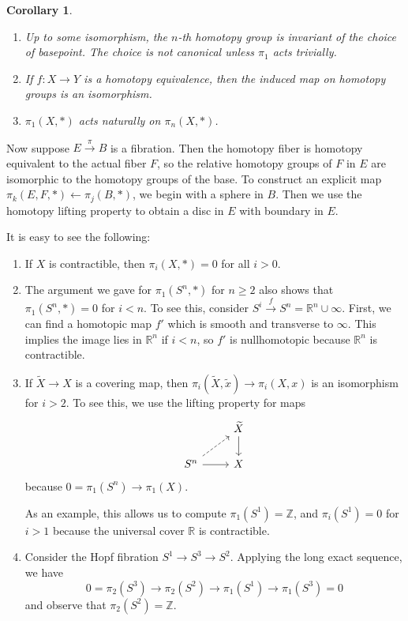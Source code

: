 \documentclass[leqno, openany]{memoir}
\newtheorem{cor}[thm]{Corollary}
\theoremstyle{definition}
\theoremstyle{remark}
\theoremstyle{plain}
\theoremstyle{definition}
\theoremstyle{remark}
\newcommand{\R}{\mathbb{R}}
\newcommand{\Z}{\mathbb{Z}}
\newcommand{\wt}[1]{\widetilde{#1}}
\begin{document}
\begin{cor}
    \begin{enumerate}
        \item Up to some isomorphism, the $n$-th homotopy group is invariant of the choice of basepoint. The choice is not canonical unless $\pi_1$ acts trivially.
        \item If $f \colon X \to Y$ is a homotopy equivalence, then the induced map on homotopy groups is an isomorphism.
        \item $\pi_1(X,*)$ acts naturally on $\pi_n(X,*)$.
    \end{enumerate}
\end{cor}

Now suppose $E \xrightarrow{\pi} B$ is a fibration. Then the homotopy fiber is homotopy equivalent to the actual fiber $F$, so the relative homotopy groups of $F$ in $E$ are isomorphic to the homotopy groups of the base. To construct an explicit map $\pi_k(E,F,*) \gets \pi_j(B,*)$, we begin with a sphere in $B$. Then we use the homotopy lifting property to obtain a disc in $E$ with boundary in $E$.

It is easy to see the following:
\begin{enumerate}
    \item If $X$ is contractible, then $\pi_i(X,*) = 0$ for all $i > 0$.
    \item The argument we gave for $\pi_1(S^n, *)$ for $n \geq 2$ also shows that $\pi_1(S^n, *) = 0$ for $i < n$. To see this, consider $S^i \xrightarrow{f} S^n = \R^n \cup \infty$. First, we can find a homotopic map $f'$ which is smooth and transverse to $\infty$. This implies the image lies in $\R^n$ if $i < n$, so $f'$ is nullhomotopic because $\R^n$ is contractible.
    \item If $\wt{X} \to X$ is a covering map, then $\pi_i(\wt{X}, \wt{x}) \to \pi_i(X,x)$ is an isomorphism for $i > 2$. To see this, we use the lifting property for maps
        \begin{equation*}
        \begin{tikzcd}
            & \wt{X} \arrow{d} \\
            S^n \arrow{r} \arrow[dashrightarrow]{ur} & X
        \end{tikzcd}
        \end{equation*}
        because $0 = \pi_1(S^n) \to \pi_1(X)$. 

        As an example, this allows us to compute $\pi_1(S^1) = \Z$, and $\pi_i(S^1) = 0$ for $i > 1$ because the universal cover $\R$ is contractible.
    \item Consider the Hopf fibration $S^1 \to S^3 \to S^2$. Applying the long exact sequence, we have
        \[ 0 = \pi_2(S^3) \to \pi_2(S^2) \to \pi_1(S^1) \to \pi_1(S^3) = 0 \]
        and observe that $\pi_2(S^2) = \Z$.
\end{enumerate}
\end{document}
